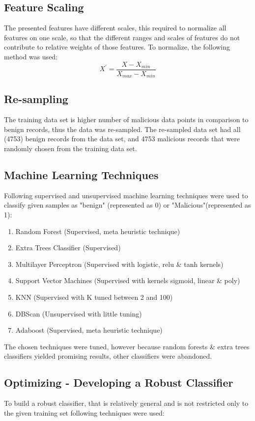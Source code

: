 \documentclass{llncs}
\begin{document}
\subsection{Feature Scaling}
The presented features have different scales, this required to normalize all features on one scale, so that the different ranges and scales of features do not contribute to relative weights of those features. To normalize, the following method was used:
\[ X^{'} =\frac{X - X_{min}}{X_{max} - X_{min}}   \]

\subsection{Re-sampling}
The training data set is higher number of malicious data points in comparison to benign records, thus the data was re-sampled. The re-sampled data set had all (4753) benign records from the data set, and 4753 malicious records that were randomly chosen from  the training data set.

\subsection{Machine Learning Techniques}
Following supervised and unsupervised machine learning techniques were used to classify given samples as "benign" (represented as 0) or "Malicious"(represented as 1):
\begin{enumerate}
   \item Random Forest (Supervised, meta heuristic technique)
   \item Extra Trees Classifier (Supervised)
   \item Multilayer Perceptron (Supervised with logistic, relu \& tanh kernels)
   \item Support Vector Machines (Supervised with kernels sigmoid, linear \& poly)
   \item KNN (Supervised with K tuned between 2 and 100)
   \item DBScan (Unsupervised with little tuning)
   \item Adaboost (Supervised, meta heuristic technique)
 \end{enumerate}
 The chosen techniques were tuned, however because random forests \& extra trees classifiers yielded promising results, other classifiers were abandoned.
\subsection{Optimizing - Developing a Robust Classifier}
To build a robust classifier, that is relatively general and is not restricted only to the given training set following techniques were used:
\end{document}
